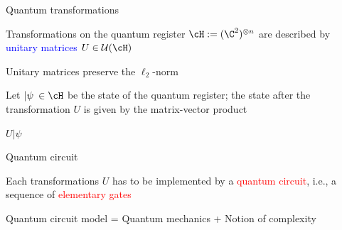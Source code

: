 


\begin{frame}{Quantum transformations}

Transformations on the quantum register $\cH:=(\C^2)^{\otimes n}$ are
described by \textcolor{blue}{unitary matrices} $U\in {\cal U}(\cH)$

\bigskip
Unitary matrices preserve the $\ell_2$-norm

\bigskip
Let $|\psi\>\in\cH$ be the state of the quantum register;  the state after the transformation $U$ is given by the matrix-vector product

\medskip
\begin{center}
{\large $U |\psi\>$}
\end{center}

\end{frame}




\begin{frame}{Quantum circuit}

Each transformations $U$ has to be implemented by a \textcolor{red}{quantum circuit}, i.e., a sequence of
\textcolor{red}{elementary gates}

\bigskip
Quantum circuit model = Quantum mechanics + Notion of complexity

\end{frame}




